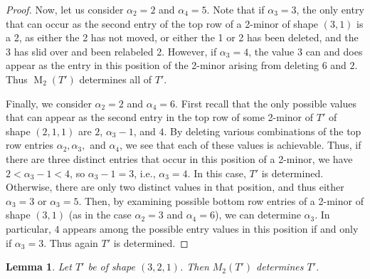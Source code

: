 \documentclass[12pt]{amsart}
\newtheorem{lemma}[theorem]{Lemma}
\theoremstyle{definition}
\theoremstyle{remark}
\numberwithin{equation}{section}
\numberwithin{figure}{section}
\newcommand{\M}{\operatorname{M}}
\begin{document}
\begin{proof}
Now, let us consider $\alpha_2=2$ and $\alpha_4=5$. Note that if $\alpha_3=3$, the only entry that can occur as the second entry of the top row of a 2-minor of shape $(3,1)$ is a 2, as either the 2 has not moved, or either the 1 or 2 has been deleted, and the 3 has slid over and been relabeled 2. However, if $\alpha_3=4$, the value 3 can and does appear as the entry in this position of the 2-minor arising from deleting $6$ and $2$. Thus $\M_2(T')$ determines all of $T'$.

Finally, we consider $\alpha_2=2$ and $\alpha_4=6$. First recall that the only possible values that can appear as the second entry in the top row of some 2-minor of $T'$ of shape $(2,1,1)$ are $2$, $\alpha_3-1$, and $4$. By deleting various combinations of the top row entries $\alpha_2,\alpha_3,$ and $\alpha_4$, we see that each of these values is achievable. Thus, if there are three distinct entries that occur in this position of a 2-minor, we have $2<\alpha_3-1<4$, so $\alpha_3-1=3$, i.e., $\alpha_3=4$. In this case, $T'$ is determined. Otherwise, there are only two distinct values in that position, and thus either $\alpha_3=3$ or $\alpha_3=5$. Then, by examining possible bottom row entries of a 2-minor of shape $(3,1)$ (as in the case $\alpha_2=3$ and $\alpha_4=6$), we can determine $\alpha_3$. In particular, $4$ appears among the possible entry values in this position if and only if $\alpha_3=3$. Thus again $T'$ is determined.
\end{proof}



\begin{lemma}
	Let $T'$ be of shape  $(3,2,1)$. Then $M_2(T')$ determines $T'$.
\end{lemma}
\end{document}
